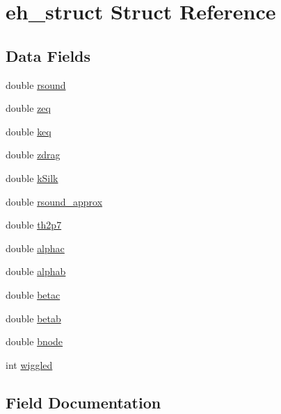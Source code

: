 \hypertarget{structeh__struct}{}\section{eh\+\_\+struct Struct Reference}
\label{structeh__struct}
\subsection*{Data Fields}
\begin{DoxyCompactItemize}
\item 
double \mbox{\hyperlink{structeh__struct_a3e1e2d1a06f3dfac72335503ccb2b219}{rsound}}
\item 
double \mbox{\hyperlink{structeh__struct_a115be04402be00203663cbf0cdeb6ccc}{zeq}}
\item 
double \mbox{\hyperlink{structeh__struct_a9eafa98df2832dd506fee87ec8a66b6c}{keq}}
\item 
double \mbox{\hyperlink{structeh__struct_af3d1d22e42cdf316b3572a9149d98596}{zdrag}}
\item 
double \mbox{\hyperlink{structeh__struct_a5765425c588003819015e840c4393da8}{k\+Silk}}
\item 
double \mbox{\hyperlink{structeh__struct_ab3e90131494df499d4be228108c04fb7}{rsound\+\_\+approx}}
\item 
double \mbox{\hyperlink{structeh__struct_afd9583995f4670685035d05749c385f0}{th2p7}}
\item 
double \mbox{\hyperlink{structeh__struct_a58de15592e924e87fe1b838599579a70}{alphac}}
\item 
double \mbox{\hyperlink{structeh__struct_a623316721501ca221093de25e216ac9f}{alphab}}
\item 
double \mbox{\hyperlink{structeh__struct_a9858b8089eb528b279fd4ce1dd1796b7}{betac}}
\item 
double \mbox{\hyperlink{structeh__struct_a9239bc067352dd1320a9b56ca6af8cae}{betab}}
\item 
double \mbox{\hyperlink{structeh__struct_a1448d0f2f95eb0d06b24b7f580c59142}{bnode}}
\item 
int \mbox{\hyperlink{structeh__struct_ac0d14bbaf13c9a0af9759ef0411ed523}{wiggled}}
\end{DoxyCompactItemize}


\subsection{Field Documentation}
\mbox{\label{structeh__struct_a623316721501ca221093de25e216ac9f}} 
